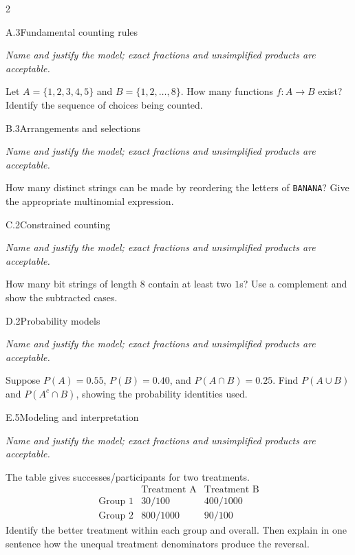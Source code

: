 \documentclass[9pt]{extarticle}
\begin{document}
\CoreWorkArea
\FormBreak
{}
\begin{multicols}{2}
\begin{CoreProblem}{A.3}{Fundamental counting rules}
{\scriptsize\textit{Name and justify the model; exact fractions and unsimplified products are acceptable.}\par}
Let $A=\{1,2,3,4,5\}$ and $B=\{1,2,\ldots,8\}$. How many functions
    $f:A\to B$ exist? Identify the sequence of choices being counted.
\end{CoreProblem}
\begin{CoreProblem}{B.3}{Arrangements and selections}
{\scriptsize\textit{Name and justify the model; exact fractions and unsimplified products are acceptable.}\par}
How many distinct strings can be made by reordering the letters of
    \texttt{BANANA}? Give the appropriate multinomial expression.
\end{CoreProblem}
\begin{CoreProblem}{C.2}{Constrained counting}
{\scriptsize\textit{Name and justify the model; exact fractions and unsimplified products are acceptable.}\par}
How many bit strings of length 8 contain at least two $1$s? Use a
    complement and show the subtracted cases.
\end{CoreProblem}
\columnbreak
\begin{CoreProblem}{D.2}{Probability models}
{\scriptsize\textit{Name and justify the model; exact fractions and unsimplified products are acceptable.}\par}
Suppose $P(A)=0.55$, $P(B)=0.40$, and $P(A\cap B)=0.25$. Find
    $P(A\cup B)$ and $P(A^c\cap B)$, showing the probability identities used.
\end{CoreProblem}
\begin{CoreProblem}{E.5}{Modeling and interpretation}
{\scriptsize\textit{Name and justify the model; exact fractions and unsimplified products are acceptable.}\par}
The table gives successes/participants for two treatments.
    \[
    \begin{array}{c|cc}
      &\text{Treatment A}&\text{Treatment B}\\\hline
      \text{Group 1}&30/100&400/1000\\
      \text{Group 2}&800/1000&90/100
    \end{array}
    \]
    Identify the better treatment within each group and overall. Then explain in
    one sentence how the unequal treatment denominators produce the reversal.
\end{CoreProblem}
\end{multicols}
\end{document}
